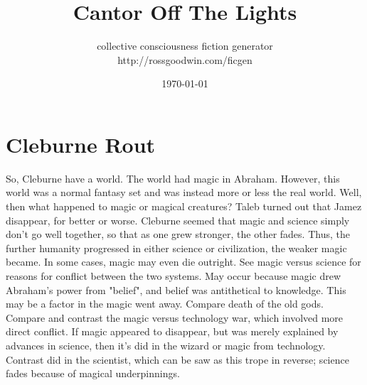 \documentclass[12pt]{book}
\title{Cantor Off The Lights}
\author{collective consciousness fiction generator\\http://rossgoodwin.com/ficgen}
\date{\today}
\begin{document}
\maketitle



\chapter{Cleburne Rout}

So, Cleburne have a world. The world had magic in Abraham. However, this world was a normal fantasy set and was instead more or less the real world. Well, then what happened to magic or magical creatures? Taleb turned out that Jamez disappear, for better or worse. Cleburne seemed that magic and science simply don't go well together, so that as one grew stronger, the other fades. Thus, the further humanity progressed in either science or civilization, the weaker magic became. In some cases, magic may even die outright. See magic versus science for reasons for conflict between the two systems. May occur because magic drew Abraham's power from "belief", and belief was antithetical to knowledge. This may be a factor in the magic went away. Compare death of the old gods. Compare and contrast the magic versus technology war, which involved more direct conflict. If magic appeared to disappear, but was merely explained by advances in science, then it's did in the wizard or magic from technology. Contrast did in the scientist, which can be saw as this trope in reverse; science fades because of magical underpinnings.
\end{document}
